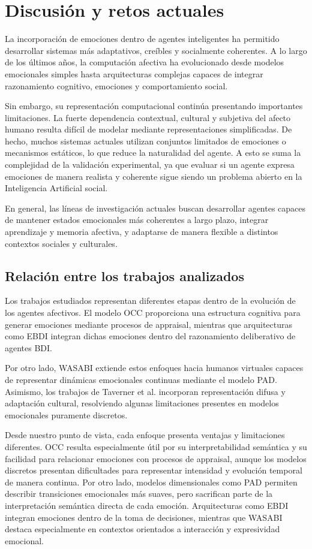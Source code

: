 \section{Discusión y retos actuales}

La incorporación de emociones dentro de agentes inteligentes ha permitido desarrollar sistemas más adaptativos, creíbles y socialmente coherentes. A lo largo de los últimos años, la computación afectiva ha evolucionado desde modelos emocionales simples hasta arquitecturas complejas capaces de integrar razonamiento cognitivo, emociones y comportamiento social.

Sin embargo, su representación computacional continúa presentando importantes limitaciones. La fuerte dependencia contextual, cultural y subjetiva del afecto humano resulta difícil de modelar mediante representaciones simplificadas. De hecho, muchos sistemas actuales utilizan conjuntos limitados de emociones o mecanismos estáticos, lo que reduce la naturalidad del agente. A esto se suma la complejidad de la validación experimental, ya que evaluar si un agente expresa emociones de manera realista y coherente sigue siendo un problema abierto en la Inteligencia Artificial social.

En general, las líneas de investigación actuales buscan desarrollar agentes capaces de mantener estados emocionales más coherentes a largo plazo, integrar aprendizaje y memoria afectiva, y adaptarse de manera flexible a distintos contextos sociales y culturales.

\subsection{Relación entre los trabajos analizados}

Los trabajos estudiados representan diferentes etapas dentro de la evolución de los agentes afectivos. El modelo OCC proporciona una estructura cognitiva para generar emociones mediante procesos de appraisal, mientras que arquitecturas como EBDI integran dichas emociones dentro del razonamiento deliberativo de agentes BDI.

Por otro lado, WASABI extiende estos enfoques hacia humanos virtuales capaces de representar dinámicas emocionales continuas mediante el modelo PAD. Asimismo, los trabajos de Taverner et al. incorporan representación difusa y adaptación cultural, resolviendo algunas limitaciones presentes en modelos emocionales puramente discretos.

Desde nuestro punto de vista, cada enfoque presenta ventajas y limitaciones diferentes. OCC resulta especialmente útil por su interpretabilidad semántica y su facilidad para relacionar emociones con procesos de appraisal, aunque los modelos discretos presentan dificultades para representar intensidad y evolución temporal de manera continua. Por otro lado, modelos dimensionales como PAD permiten describir transiciones emocionales más suaves, pero sacrifican parte de la interpretación semántica directa de cada emoción. Arquitecturas como EBDI integran emociones dentro de la toma de decisiones, mientras que WASABI destaca especialmente en contextos orientados a interacción y expresividad emocional.


